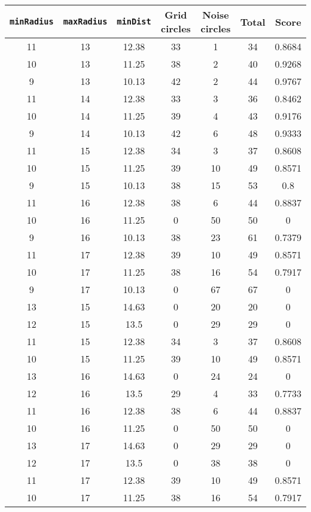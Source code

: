 \documentclass[letterpaper, 12pt]{article}
\begin{document}
\begin{longtable}{|c|c|c|c|c|c|c|}
\hline
\textbf{\texttt{minRadius}} & \textbf{\texttt{maxRadius}} & \textbf{\texttt{minDist}} & \textbf{Grid circles} & \textbf{Noise circles} & \textbf{Total} & \textbf{Score} \\
\hline
11 & 13 & 12.38 & 33 & 1 & 34 & 0.8684 \\
\hline
10 & 13 & 11.25 & 38 & 2 & 40 & 0.9268 \\
\hline
9 & 13 & 10.13 & 42 & 2 & 44 & 0.9767 \\
\hline
11 & 14 & 12.38 & 33 & 3 & 36 & 0.8462 \\
\hline
10 & 14 & 11.25 & 39 & 4 & 43 & 0.9176 \\
\hline
9 & 14 & 10.13 & 42 & 6 & 48 & 0.9333 \\
\hline
11 & 15 & 12.38 & 34 & 3 & 37 & 0.8608 \\
\hline
10 & 15 & 11.25 & 39 & 10 & 49 & 0.8571 \\
\hline
9 & 15 & 10.13 & 38 & 15 & 53 & 0.8 \\
\hline
11 & 16 & 12.38 & 38 & 6 & 44 & 0.8837 \\
\hline
10 & 16 & 11.25 & 0 & 50 & 50 & 0 \\
\hline
9 & 16 & 10.13 & 38 & 23 & 61 & 0.7379 \\
\hline
11 & 17 & 12.38 & 39 & 10 & 49 & 0.8571 \\
\hline
10 & 17 & 11.25 & 38 & 16 & 54 & 0.7917 \\
\hline
9 & 17 & 10.13 & 0 & 67 & 67 & 0 \\
\hline
13 & 15 & 14.63 & 0 & 20 & 20 & 0 \\
\hline
12 & 15 & 13.5 & 0 & 29 & 29 & 0 \\
\hline
11 & 15 & 12.38 & 34 & 3 & 37 & 0.8608 \\
\hline
10 & 15 & 11.25 & 39 & 10 & 49 & 0.8571 \\
\hline
13 & 16 & 14.63 & 0 & 24 & 24 & 0 \\
\hline
12 & 16 & 13.5 & 29 & 4 & 33 & 0.7733 \\
\hline
11 & 16 & 12.38 & 38 & 6 & 44 & 0.8837 \\
\hline
10 & 16 & 11.25 & 0 & 50 & 50 & 0 \\
\hline
13 & 17 & 14.63 & 0 & 29 & 29 & 0 \\
\hline
12 & 17 & 13.5 & 0 & 38 & 38 & 0 \\
\hline
11 & 17 & 12.38 & 39 & 10 & 49 & 0.8571 \\
\hline
10 & 17 & 11.25 & 38 & 16 & 54 & 0.7917 \\

\end{longtable}
\end{document}
